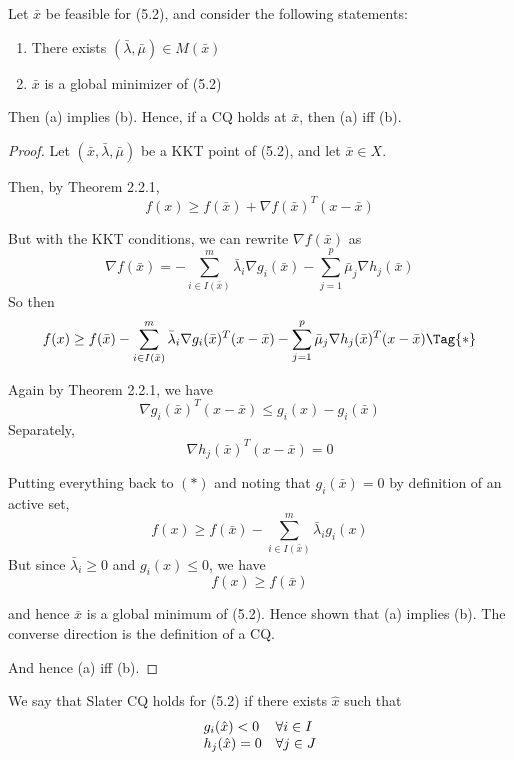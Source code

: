 
Let $\bar x$ be feasible for (5.2), and consider the following statements:
\begin{enumerate}[label=(\alph*)]
	\item There exists $(\bar\lambda,\bar\mu)\in M(\bar x)$
	\item $\bar x$ is a global minimizer of (5.2)
\end{enumerate}

Then (a) implies (b). Hence, if a CQ holds at $\bar x$, then (a) iff
(b).


%
%

\begin{proof}
	\def\bx{\bar x}\def\bl{\bar\lambda}\def\bm{\bar\mu}
	\def\Act{I(\bx)}
	Let $(\bx,\bl,\bm)$ be a KKT point of (5.2), and let $\bar x\in X$.

	Then, by Theorem 2.2.1,
	$$
		f(x)\geq f(\bx) + \nabla f(\bx)^T(x-\bx)
	$$

	But with the KKT conditions, we can rewrite $\nabla f(\bx)$ as
	$$
		\nabla f(\bx)=-\sum_{i\in\Act}^m\bl_i \nabla g_i(\bx)-\sum_{j=1}^p\bm_j\nabla h_j(\bx)
	$$
	So then
	\begin{align*}
		f(x)\geq f(\bx)-\sum_{i\in\Act}^m\bl_i\nabla g_i(\bx)^T(x-\bx)-\sum_{j=1}^p\bm_j\nabla h_j(\bx)^T(x-\bx)\Tag{*}
	\end{align*}

	Again by Theorem 2.2.1, we have
	$$
		\nabla g_i(\bx)^T(x-\bx)\leq g_i(x)-g_i(\bx)
	$$
	Separately,
	$$
		\nabla h_j(\bx)^T(x-\bx)=0
	$$

	Putting everything back to $(*)$ and noting that $g_i(\bar x)=0$ by
	definition of an active set,
	$$
		f(x)\geq f(\bx)-\sum_{i\in\Act}^m\bl_ig_i(x)
	$$
	But since $\bl_i\geq0$ and $g_i(x)\leq0$, we have
	$$
		f(x)\geq f(\bx)
	$$

	and hence $\bar x$ is a global minimum of (5.2). Hence shown that
	(a) implies (b). The converse direction is the definition of a CQ.

	And hence (a) iff (b).
\end{proof}


We say that Slater CQ holds for (5.2) if there exists $\hat x$ such that
$$
	\begin{array}{l l}
		g_i(\hat x)<0 & \forall i\in I \\
		h_j(\hat x)=0 & \forall j\in J
	\end{array}
$$

